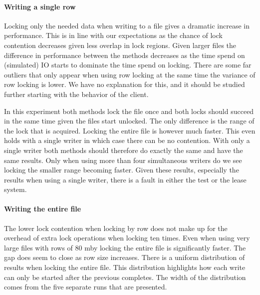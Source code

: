\paragraph{Writing a single row}
Locking only the needed data when writing to a file gives a dramatic increase in performance. This is in line with our expectations as the chance of lock contention decreases given less overlap in lock regions. Given larger files the difference in performance between the methods decreases as the time spend on (simulated) IO starts to dominate the time spend on locking. There are some far outliers that only appear when using row locking at the same time the variance of row locking is lower. We have no explanation for this, and it should be studied further starting with the behavior of the client.

In this experiment both methods lock the file once and both locks should succeed in the same time given the files start unlocked. The only difference is the range of the lock that is acquired. Locking the entire file is however much faster. This even holds with a single writer in which case there can be no contention. With only a single writer both methods should therefore do exactly the same and have the same results. Only when using more than four simultaneous writers do we see locking the smaller range becoming faster. Given these results, especially the results when using a single writer, there is a fault in either the test or the lease system.
%
\paragraph{Writing the entire file}
The lower lock contention when locking by row does not make up for the overhead of extra lock operations when locking ten times. Even when using very large files with rows of 80 \ac{mby} locking the entire file is significantly faster. The gap does seem to close as row size increases. There is a uniform distribution of results when locking the entire file. This distribution highlights how each write can only be started after the previous completes. The width of the distribution comes from the five separate runs that are presented.
